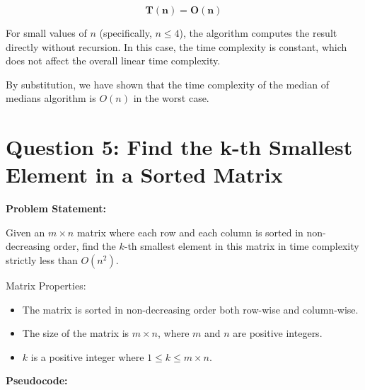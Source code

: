 \documentclass[a4paper,12pt]{report}
\begin{document}
\begin{tcolorbox}[colback=white, colframe=black, boxrule=0.5pt] %
\[
\mathbf{T(n) = O(n)}
\]
\end{tcolorbox}

For small values of $n$ (specifically, $n \leq 4$), the algorithm computes the result directly without recursion. In this case, the time complexity is constant, which does not affect the overall linear time complexity.

By substitution, we have shown that the time complexity of the median of medians algorithm is $O(n)$ in the worst case.


\section*{Question 5: Find the k-th Smallest Element in a Sorted Matrix}

\textbf{Problem Statement:}  

Given an \( m \times n \) matrix where each row and each column is sorted in non-decreasing order, find the \( k \)-th smallest element in this matrix in time complexity strictly less than \( O(n^2) \). 

Matrix Properties:
\begin{itemize}
    \item The matrix is sorted in non-decreasing order both row-wise and column-wise.
    \item The size of the matrix is \( m \times n \), where \( m \) and \( n \) are positive integers.
    \item \( k \) is a positive integer where \( 1 \leq k \leq m \times n \).
\end{itemize}

\textbf{Pseudocode:}
\end{document}

